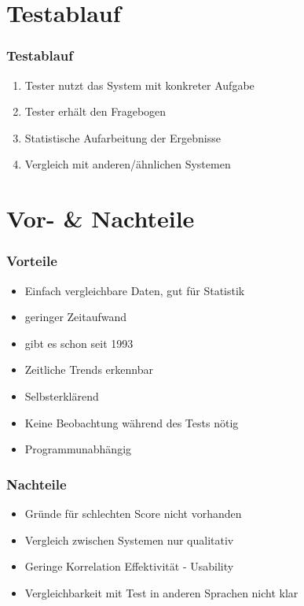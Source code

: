 \documentclass[12pt, aspectratio=169]{beamer}
\begin{document}
\section{Testablauf}
\begin{frame}
	\frametitle{Testablauf}
	\begin{enumerate}
		\item<1> Tester nutzt das System mit konkreter Aufgabe
		\item<1> Tester erhält den Fragebogen
		\item<1> Statistische Aufarbeitung der Ergebnisse
		\item<1> Vergleich mit anderen/ähnlichen Systemen
	\end{enumerate}
\end{frame}

\section{Vor- \& Nachteile}
\begin{frame}
	\frametitle{Vorteile}
	\begin{itemize}
		\item<1> Einfach vergleichbare Daten, gut für Statistik
		\item<1> geringer Zeitaufwand
		\item<1> gibt es schon seit 1993
		\item<1> Zeitliche Trends erkennbar
		\item<1> Selbsterklärend
		\item<1> Keine Beobachtung während des Tests nötig
		\item<1> Programmunabhängig
	\end{itemize}
\end{frame}

\begin{frame}
	\frametitle{Nachteile}
	\begin{itemize}
		\item<1> Gründe für schlechten Score nicht vorhanden
		\item<1> Vergleich zwischen Systemen nur qualitativ
		\item<1> Geringe Korrelation Effektivität - Usability
		\item<1> Vergleichbarkeit mit Test in anderen Sprachen nicht klar
	\end{itemize}
\end{frame}
\end{document}

